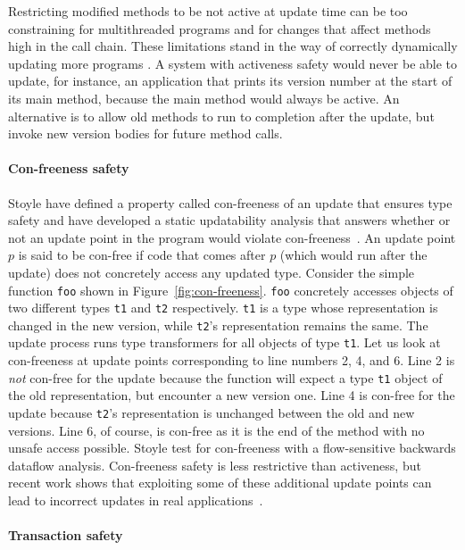 Restricting modified methods to be not active at update time can be too
constraining for multithreaded programs and for changes that affect methods
high in the call chain. These limitations
stand in the way of correctly dynamically updating more programs
\cite{hicks-thesis, armstrong}. A
system with activeness safety would never be able to update, for instance,
an application that prints its version number at the start of its main
method, because the main method would always be active. An
alternative is to allow old methods to run to completion after the update,
but invoke new version bodies for future method calls.



\paragraph{Con-freeness safety}

Stoyle \EA have defined a property called
con-free\-ness of an update that ensures type safety and
have developed a static updatability analysis that answers whether or not
an update point in the program would violate con-freeness~\cite{mutatis}. An update point
$p$ is said to be con-free if code that comes after $p$ (which would run
after the update) does not concretely access any updated type. Consider the
simple function {\tt foo} shown in Figure~\ref{fig:con-freeness}. {\tt foo}
concretely accesses objects of two different types {\tt t1} and {\tt t2}
respectively. {\tt t1} is a type whose representation is changed in the new
version, while {\tt t2}'s representation remains the same. The update
process runs type transformers for all objects of type {\tt t1}. Let us
look at con-freeness at update points corresponding to line numbers 2, 4,
and 6. Line 2 is {\em not} con-free for the update because the function
will expect a type {\tt t1} object of the old representation, but encounter
a new version one. Line 4 is con-free for the update because {\tt t2}'s
representation is unchanged between the old and new versions. Line 6, of
course, is con-free as it is the end of the method with no unsafe access
possible. Stoyle \EA test for con-freeness with a flow-sensitive backwards
dataflow analysis. Con-freeness safety is less restrictive than activeness,
but recent work shows that exploiting some of these additional update
points can lead to incorrect updates in real applications~\cite{dsu-testing}.

\paragraph{Transaction safety}

